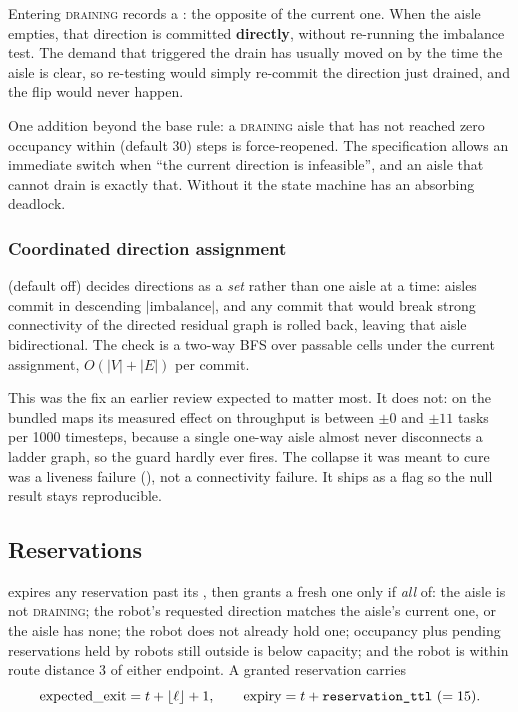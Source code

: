 Entering \textsc{draining} records a : the opposite of
the current one. When the aisle empties, that direction is committed
\textbf{directly}, without re-running the imbalance test. The demand that
triggered the drain has usually moved on by the time the aisle is clear, so
re-testing would simply re-commit the direction just drained, and the flip
would never happen.

One addition beyond the base rule: a \textsc{draining} aisle that has not
reached zero occupancy within  (default 30) steps is
force-reopened. The specification allows an immediate switch when ``the current
direction is infeasible'', and an aisle that cannot drain is exactly that.
Without it the state machine has an absorbing deadlock.

\subsubsection{Coordinated direction assignment}
\label{sec:aisle-coordination}

 (default off) decides directions as a
\emph{set} rather than one aisle at a time: aisles commit in descending
$|\mathrm{imbalance}|$, and any commit that would break strong connectivity of
the directed residual graph is rolled back, leaving that aisle bidirectional.
The check is a two-way BFS over passable cells under the current assignment,
$O(|V| + |E|)$ per commit.

\begin{caveat}
This was the fix an earlier review expected to matter most. It does not: on the
bundled maps its measured effect on throughput is between $\pm 0$ and
$\pm 11$ tasks per 1000 timesteps, because a single one-way aisle almost never disconnects a ladder
graph, so the guard hardly ever fires. The collapse it was meant to cure was a
liveness failure (), not a connectivity failure. It
ships as a flag so the null result stays reproducible.
\end{caveat}

\subsection{Reservations}
\label{sec:aisle-reservations}

 expires any reservation past its
, then grants a fresh one only if \emph{all} of: the aisle
is not \textsc{draining}; the robot's requested direction matches the aisle's
current one, or the aisle has none; the robot does not already hold one;
occupancy plus pending reservations held by robots still outside is below
capacity; and the robot is within route distance 3 of either endpoint. A
granted reservation carries
\begin{equation}
  \mathrm{expected\_exit} = t + \lfloor \ell \rfloor + 1,
  \qquad
  \mathrm{expiry} = t + \texttt{reservation\_ttl} \ (= 15).
\end{equation}

